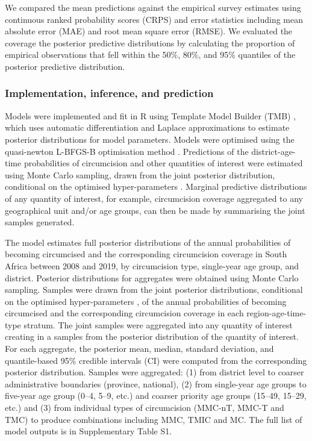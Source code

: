 \documentclass{article}
\begin{document}
We compared the mean predictions against the empirical survey estimates using continuous ranked probability scores (CRPS) and error statistics including mean absolute error (MAE) and root mean square error (RMSE). We evaluated the coverage the posterior predictive distributions by calculating the proportion of empirical observations that fell within the 50\%, 80\%, and 95\% quantiles of the posterior predictive distribution. 


\subsubsection*{Implementation, inference, and prediction}


Models were implemented and fit in R \cite{rcore} using Template Model Builder (TMB) \cite{kristensen2016tmb}, which uses automatic differentiation and Laplace approximations to estimate posterior distributions for model parameters. Models were optimised using the quasi-newton L-BFGS-B optimisation method \cite{byrd1995limited}. Predictions of the district-age-time probabilities of circumcision and other quantities of interest were estimated using Monte Carlo sampling, drawn from the joint posterior distribution, conditional on the optimised hyper-parameters \cite{eaton2021naomi}. Marginal predictive distributions of any quantity of interest, for example, circumcision coverage aggregated to any geographical unit and/or age groups, can then be made by summarising the joint samples generated.

The model estimates full posterior distributions of the annual probabilities of becoming circumcised and the corresponding circumcision coverage in South Africa between 2008 and 2019, by circumcision type, single-year age group, and district. Posterior distributions for aggregates were obtained using Monte Carlo sampling. Samples were drawn from the joint posterior distributions, conditional on the optimised hyper-parameters \cite{eaton2021naomi}, of the annual probabilities of becoming circumcised and the corresponding circumcision coverage in each region-age-time-type stratum. The joint samples were aggregated into any quantity of interest creating in a samples from the posterior distribution of the quantity of interest. For each aggregate, the posterior mean, median, standard deviation, and quantile-based 95\% credible intervals (CI) were computed from the corresponding posterior distribution. Samples were aggregated: (1) from district level to coarser administrative boundaries (province, national), (2) from single-year age groups to five-year age group (0--4, 5--9, etc.) and coarser priority age groups (15--49, 15--29, etc.) and (3) from individual types of circumcision (MMC-nT, MMC-T and TMC) to produce combinations including MMC, TMIC and MC. The full list of model outputs is in Supplementary Table S1. 
\end{document}
